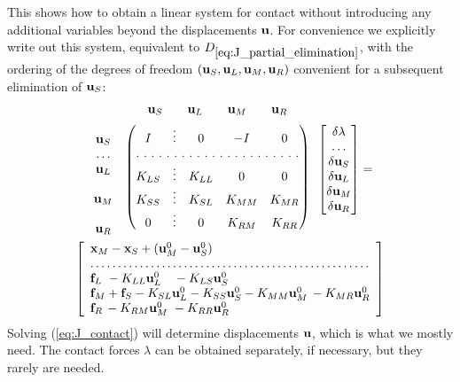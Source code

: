 \documentclass[11pt]{article}
\newcommand{\vecx}{{\bf x}}
\newcommand{\vecu}{{\bf u}}
\newcommand{\vecf}{{\bf f}}
\begin{document}
This shows how to obtain a linear system for contact without introducing any additional variables beyond the displacements $\vecu$.
For convenience we explicitly write out this system, equivalent to $D_{\ref{eq:J_partial_elimination}}$, with the ordering of the degrees
of freedom $(\vecu_S, \vecu_L, \vecu_M, \vecu_R)$ convenient for a subsequent elimination of $\vecu_S$:
\begin{multline}
\label{eq:J_contact}
\begin{array}{lc}  &  \begin{array}{cccc} \vecu_S \quad & \vecu_L \quad & \vecu_M & \quad \vecu_R \end{array}\\
\begin{matrix} \\ \vecu_S  \\ \dots \\ \vecu_L \\ \\ \vecu_M \\ \\ \vecu_R\end{matrix} &
\begin{pmatrix}
  I    & \vdots&   0    & -I   & 0\\
  \hdotsfor[2]{5}\\
  K_{LS}&\vdots&   K_{LL}&  0   & 0\\
  K_{SS}&\vdots&   K_{SL}& K_{MM}& K_{MR}\\
  0    &\vdots&   0     & K_{RM}& K_{RR}
\end{pmatrix}
\end{array}
\begin{bmatrix}
\delta \lambda\\ \dots \\ \delta \vecu_S \\ \delta \vecu_L \\ \delta \vecu_M \\ \delta \vecu_R
\end{bmatrix}
=\\
\left[\begin{array}{l}
\vecx_M - \vecx_S + (\vecu_M^0 - \vecu_S^0)\\
\dots\dots\dots\dots\dots\dots\dots\dots\dots\dots\dots\dots\dots\dots\dots\dots\dots\\
\vecf_L \ - K_{LL} \vecu_L^0 \ \ \ - K_{LS} \vecu_S^0 \\
\vecf_M + \vecf_S - K_{SL} \vecu_L^0 - K_{SS} \vecu_S^0 - K_{MM} \vecu_M^0 \, - K_{MR} \vecu_R^0\\
\vecf_R \, - K_{RM} \vecu_M^0 \ - K_{RR} \vecu_R^0 \\
\end{array}\right]
\end{multline}
Solving (\ref{eq:J_contact}) will determine displacements $\vecu$, which is what we mostly need.  The contact forces $\lambda$ can be obtained separately,
if necessary, but they rarely are needed.
\end{document}
